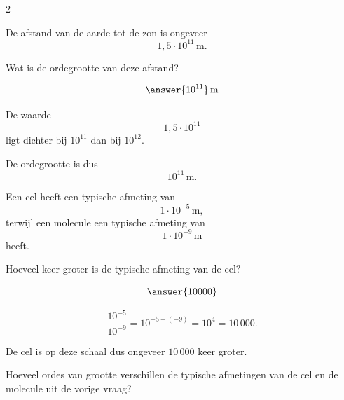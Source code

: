 \documentclass{ximera}
\begin{document}
\begin{oefening}{\oefU}
\begin{multicols}{2}
                
                \begin{question}
                De afstand van de aarde tot de zon is ongeveer
                \[
                1{,}5\cdot10^{11}\,\mathrm m.
                \]
                
                Wat is de ordegrootte van deze afstand?
                
                \[
                \answer{10^{11}}\,\mathrm m
                \]
                
                \begin{oplossing}
                De waarde
                \[
                1{,}5\cdot10^{11}
                \]
                ligt dichter bij $10^{11}$ dan bij $10^{12}$.
                
                De ordegrootte is dus
                \[
                10^{11}\,\mathrm m.
                \]
                \end{oplossing}
                \end{question}
                
                
                \begin{question}
                Een cel heeft een typische afmeting van
                \[
                1\cdot10^{-5}\,\mathrm m,
                \]
                terwijl een molecule een typische afmeting van
                \[
                1\cdot10^{-9}\,\mathrm m
                \]
                heeft.
                
                Hoeveel keer groter is de typische afmeting van de cel?
                
                \[
                \answer{10000}
                \]
                
                \begin{oplossing}
                \[
                \dfrac{10^{-5}}{10^{-9}}
                =10^{-5-(-9)}
                =10^4
                =10\,000.
                \]
                
                De cel is op deze schaal dus ongeveer $10\,000$ keer groter.
                \end{oplossing}
                \end{question}
                
                
                \begin{question}
                Hoeveel ordes van grootte verschillen de typische afmetingen van de cel
                en de molecule uit de vorige vraag?
                

\end{question}
\end{multicols}
\end{oefening}
\end{document}
